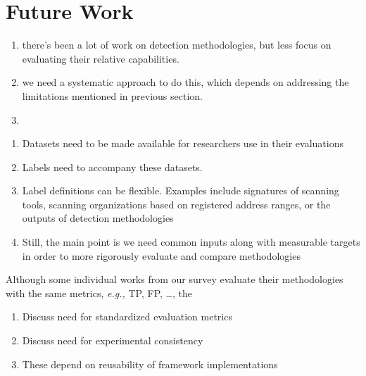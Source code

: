 \documentclass[manuscript,nonacm]{acmart}
\begin{document}
\label{sec:fw}
\section{Future Work}


\begin{enumerate}
    \item there's been a lot of work on detection methodologies, but less focus on evaluating their relative capabilities.
    \item we need a systematic approach to do this, which depends on addressing the limitations mentioned in previous section.
    \item 
\end{enumerate}



\begin{enumerate}
    \item Datasets need to be made available for researchers use in their evaluations
    \item Labels need to accompany these datasets. 
    \item Label definitions can be flexible. Examples include signatures of scanning tools, scanning organizations based on registered address ranges, or the outputs of detection methodologies
    \item Still, the main point is we need common inputs along with measurable targets in order to more rigorously evaluate and compare methodologies
\end{enumerate}


Although some individual works from our survey evaluate their methodologies with the same metrics, \textit{e.g.,} TP, FP, \dots, 
the

\begin{enumerate}
	\item Discuss need for standardized evaluation metrics
	\item Discuss need for experimental consistency
	\item These depend on reusability of framework implementations
\end{enumerate}
\end{document}
